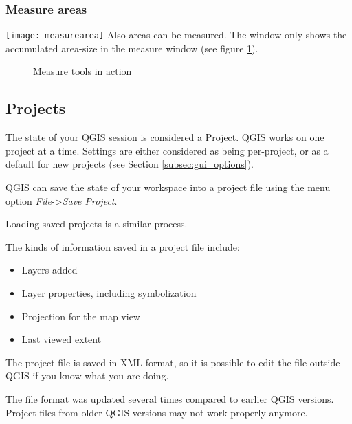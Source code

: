 \subsubsection{Measure areas}
\texttt{[image: measurearea]} Also areas can be measured. The window only shows the
accumulated area-size in the measure window (see figure \ref{fig:measure}).

\begin{figure}[h]
\caption{Measure tools in action} \label{fig:measure}
\centering
   \goodgap
\end{figure}

\subsection{Projects}\label{sec:projects}

The state of your QGIS session is considered a Project.  QGIS
works on one project at a time.  Settings are either considered
as being per-project, or as a default for new projects (see
Section \ref{subsec:gui_options}).

QGIS can save the state of your workspace into a project file using
the menu option \textit{File}->\textit{Save Project}.

Loading saved projects is a similar process.

The kinds of information saved in a project file include:

\begin{itemize}
\item Layers added
\item Layer properties, including symbolization
\item Projection for the map view
\item Last viewed extent
\end{itemize}

The project file is saved in XML format, so it is possible to edit
the file outside QGIS if you know what you are doing.  

The file format was updated several times compared to earlier QGIS versions. Project files 
from older QGIS versions may not work properly anymore.

